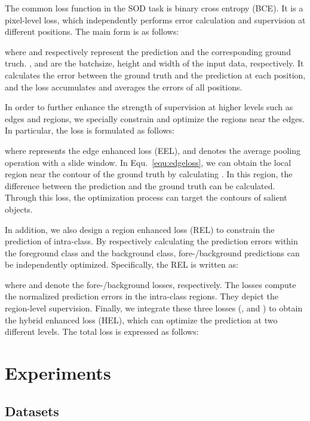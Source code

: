 \documentclass[runningheads]{llncs}
\begin{document}
The common loss function in the SOD task is binary cross entropy (BCE). It is a pixel-level loss, which independently performs error calculation and supervision at different positions. The main form is as follows:

\noindent where  and  respectively represent the prediction and the corresponding ground truch. ,  and  are the batchsize, height and width of the input data, respectively. It calculates the error between the ground truth  and the prediction  at each position, and the loss  accumulates and averages the errors of all positions.

In order to further enhance the strength of supervision at higher levels such as edges and regions, we specially constrain and optimize the regions near the edges. In particular, the loss is formulated as follows:

\noindent where  represents the edge enhanced loss (EEL), and  denotes the average pooling operation with a  slide window.
In Equ.~\ref{equ:edgeloss}, we can obtain the local region near the contour of the ground truth by calculating . In this region, the difference  between the prediction  and the ground truth  can be calculated. Through this loss, the optimization process can target the contours of salient objects.

In addition, we also design a region enhanced loss (REL)  to constrain the prediction of intra-class. By respectively calculating the prediction errors within the foreground class and the background class, fore-/background predictions can be independently optimized. Specifically, the REL  is written as:

\noindent where  and  denote the fore-/background losses, respectively. The losses compute the normalized prediction errors in the intra-class regions. They depict the region-level supervision.
Finally, we integrate these three losses (,  and ) to obtain the hybrid enhanced loss (HEL), which can optimize the prediction at two different levels.  The total loss is expressed as follows:


\section{Experiments}

\subsection{Datasets}
\end{document}
